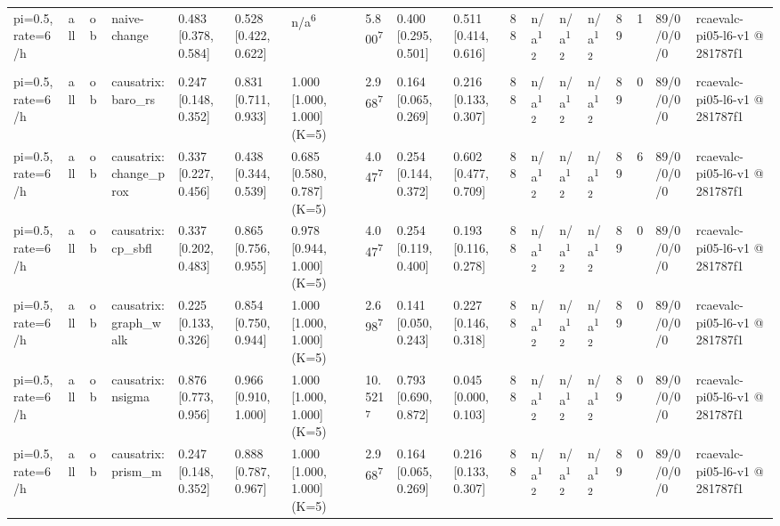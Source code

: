 \begin{table}[t]
\begin{tabular}{llllllllllllllllll}
pi=0.5, rate=6/h & all & ob & naive-change & 0.483 [0.378, 0.584] & 0.528 [0.422, 0.622] & n/a\textsuperscript{6} & 5.800\textsuperscript{7} & 0.400 [0.295, 0.501] & 0.511 [0.414, 0.616] & 88 & n/a\textsuperscript{12} & n/a\textsuperscript{12} & n/a\textsuperscript{12} & 89 & 1 & 89/0/0/0/0 & rcaevalc-pi05-l6-v1 @ 281787f1 \\
pi=0.5, rate=6/h & all & ob & causatrix:baro\_rs & 0.247 [0.148, 0.352] & 0.831 [0.711, 0.933] & 1.000 [1.000, 1.000] (K=5) & 2.968\textsuperscript{7} & 0.164 [0.065, 0.269] & 0.216 [0.133, 0.307] & 88 & n/a\textsuperscript{12} & n/a\textsuperscript{12} & n/a\textsuperscript{12} & 89 & 0 & 89/0/0/0/0 & rcaevalc-pi05-l6-v1 @ 281787f1 \\
pi=0.5, rate=6/h & all & ob & causatrix:change\_prox & 0.337 [0.227, 0.456] & 0.438 [0.344, 0.539] & 0.685 [0.580, 0.787] (K=5) & 4.047\textsuperscript{7} & 0.254 [0.144, 0.372] & 0.602 [0.477, 0.709] & 88 & n/a\textsuperscript{12} & n/a\textsuperscript{12} & n/a\textsuperscript{12} & 89 & 6 & 89/0/0/0/0 & rcaevalc-pi05-l6-v1 @ 281787f1 \\
pi=0.5, rate=6/h & all & ob & causatrix:cp\_sbfl & 0.337 [0.202, 0.483] & 0.865 [0.756, 0.955] & 0.978 [0.944, 1.000] (K=5) & 4.047\textsuperscript{7} & 0.254 [0.119, 0.400] & 0.193 [0.116, 0.278] & 88 & n/a\textsuperscript{12} & n/a\textsuperscript{12} & n/a\textsuperscript{12} & 89 & 0 & 89/0/0/0/0 & rcaevalc-pi05-l6-v1 @ 281787f1 \\
pi=0.5, rate=6/h & all & ob & causatrix:graph\_walk & 0.225 [0.133, 0.326] & 0.854 [0.750, 0.944] & 1.000 [1.000, 1.000] (K=5) & 2.698\textsuperscript{7} & 0.141 [0.050, 0.243] & 0.227 [0.146, 0.318] & 88 & n/a\textsuperscript{12} & n/a\textsuperscript{12} & n/a\textsuperscript{12} & 89 & 0 & 89/0/0/0/0 & rcaevalc-pi05-l6-v1 @ 281787f1 \\
pi=0.5, rate=6/h & all & ob & causatrix:nsigma & 0.876 [0.773, 0.956] & 0.966 [0.910, 1.000] & 1.000 [1.000, 1.000] (K=5) & 10.521\textsuperscript{7} & 0.793 [0.690, 0.872] & 0.045 [0.000, 0.103] & 88 & n/a\textsuperscript{12} & n/a\textsuperscript{12} & n/a\textsuperscript{12} & 89 & 0 & 89/0/0/0/0 & rcaevalc-pi05-l6-v1 @ 281787f1 \\
pi=0.5, rate=6/h & all & ob & causatrix:prism\_m & 0.247 [0.148, 0.352] & 0.888 [0.787, 0.967] & 1.000 [1.000, 1.000] (K=5) & 2.968\textsuperscript{7} & 0.164 [0.065, 0.269] & 0.216 [0.133, 0.307] & 88 & n/a\textsuperscript{12} & n/a\textsuperscript{12} & n/a\textsuperscript{12} & 89 & 0 & 89/0/0/0/0 & rcaevalc-pi05-l6-v1 @ 281787f1 \\

\end{tabular}
\end{table}

